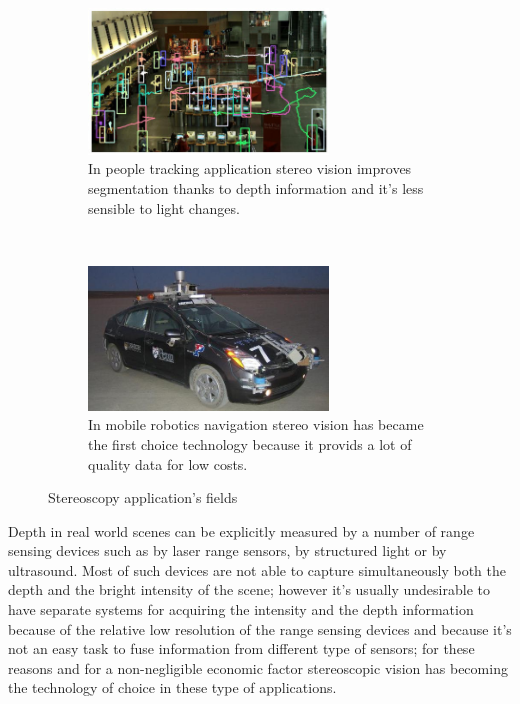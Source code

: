 \begin{figure}[h!]
\centering
\begin{subfigure}[]{0.5\textwidth}
		\centering
        \includegraphics[width=0.7\textwidth]{./img/tracking.jpg}
                \caption{\scriptsize{In people tracking application stereo vision improves segmentation thanks to depth information and it's less sensible to light changes.}}
\end{subfigure}%
~ \quad
\begin{subfigure}[]{0.5\textwidth}
		\centering
        \includegraphics[width=0.7\textwidth]{./img/little_ben.jpg}
                \caption{\scriptsize{In mobile robotics navigation stereo vision has became the first choice technology because it provids a lot of quality data for low costs.}}
\end{subfigure} 
\caption{\small{Stereoscopy application's fields}\label{appl}}
\end{figure}
Depth in real world scenes can be explicitly measured by a number of range sensing devices such as by laser range sensors, by structured light or by ultrasound. Most of such devices are not able to capture simultaneously both the depth and the bright intensity of the scene; however it's usually undesirable to have separate systems for acquiring the intensity and the depth information because of the relative low resolution of the range sensing devices and because it's not an easy task to fuse information from different type of sensors; for these reasons and for a non-negligible economic factor stereoscopic vision has becoming the technology of choice in these type of applications.
